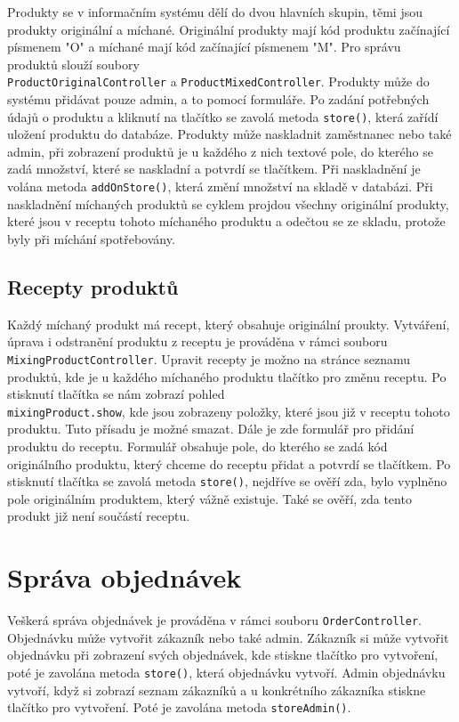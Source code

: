Produkty se v informačním systému dělí do dvou hlavních skupin, těmi jsou produkty originální a míchané. Originální produkty mají kód produktu začínající písmenem "O" a míchané mají kód začínající písmenem "M". Pro správu produktů slouží soubory \\ \texttt{ProductOriginalController} a \texttt{ProductMixedController}. Produkty může do systému přidávat pouze admin, a to pomocí formuláře. Po zadání potřebných údajů o produktu a kliknutí na tlačítko se zavolá metoda \texttt{store()}, která zařídí uložení produktu do databáze. Produkty může naskladnit zaměstnanec nebo také admin, při zobrazení produktů je u každého z nich textové pole, do kterého se zadá množství, které se naskladní a potvrdí se tlačítkem. Při naskladnění je volána metoda \texttt{addOnStore()}, která změní množství na skladě v databázi. Při naskladnění míchaných produktů se cyklem projdou všechny originální produkty, které jsou v receptu tohoto míchaného produktu a odečtou se ze skladu, protože byly při míchání spotřebovány.

\subsection{Recepty produktů}

Každý míchaný produkt má recept, který obsahuje originální proukty. Vytváření, úprava i odstranění produktu z receptu je prováděna v rámci souboru \texttt{MixingProductController}. Upravit recepty je možno na stránce seznamu produktů, kde je u každého míchaného produktu tlačítko pro změnu receptu. Po stisknutí tlačítka se nám zobrazí pohled \\ \texttt{mixingProduct.show}, kde jsou zobrazeny položky, které jsou již v receptu tohoto produktu. Tuto přísadu je možné smazat.  Dále je zde formulář pro přidání produktu do receptu. Formulář obsahuje pole, do kterého se zadá kód originálního produktu, který chceme do receptu přidat a potvrdí se tlačítkem. Po stisknutí tlačítka se zavolá metoda \texttt{store()}, nejdříve se ověří zda, bylo vyplněno pole originálním produktem, který vážně existuje. Také se ověří, zda tento produkt již není součástí receptu.

\section{Správa objednávek}

Veškerá správa objednávek je prováděna v rámci souboru \texttt{OrderController}. Objednávku může vytvořit zákazník nebo také admin. Zákazník si může vytvořit objednávku při zobrazení svých objednávek, kde stiskne tlačítko pro vytvoření, poté je zavolána metoda \texttt{store()}, která objednávku vytvoří. Admin objednávku vytvoří, když si zobrazí seznam zákazníků a u konkrétního zákazníka stiskne tlačítko pro vytvoření. Poté je zavolána metoda \texttt{storeAdmin()}.

